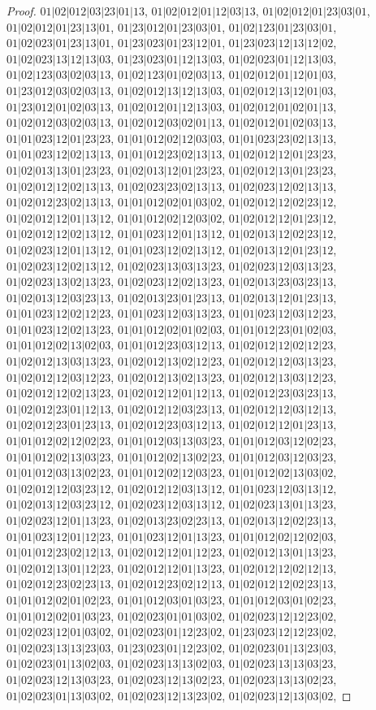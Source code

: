 \documentclass[12pt]{article}
\theoremstyle{plain}
\theoremstyle{definition}
\theoremstyle{remark}
\begin{document}
\begin{proof}
$01|02|012|03|23|01|13$, $01|02|012|01|12|03|13$, $01|02|012|01|23|03|01$, $01|02|012|01|23|13|01$, $01|23|012|01|23|03|01$, $01|02|123|01|23|03|01$, $01|02|023|01|23|13|01$, $01|23|023|01|23|12|01$, $01|23|023|12|13|12|02$, $01|02|023|13|12|13|03$, $01|23|023|01|12|13|03$, $01|02|023|01|12|13|03$, $01|02|123|03|02|03|13$, $01|02|123|01|02|03|13$, $01|02|012|01|12|01|03$, $01|23|012|03|02|03|13$, $01|02|012|13|12|13|03$, $01|02|012|13|12|01|03$, $01|23|012|01|02|03|13$, $01|02|012|01|12|13|03$, $01|02|012|01|02|01|13$, $01|02|012|03|02|03|13$, $01|02|012|03|02|01|13$, $01|02|012|01|02|03|13$, $01|01|023|12|01|23|23$, $01|01|012|02|12|03|03$, $01|01|023|23|02|13|13$, $01|01|023|12|02|13|13$, $01|01|012|23|02|13|13$, $01|02|012|12|01|23|23$, $01|02|013|13|01|23|23$, $01|02|013|12|01|23|23$, $01|02|012|13|01|23|23$, $01|02|012|12|02|13|13$, $01|02|023|23|02|13|13$, $01|02|023|12|02|13|13$, $01|02|012|23|02|13|13$, $01|01|012|02|01|03|02$, $01|02|012|12|02|23|12$, $01|02|012|12|01|13|12$, $01|01|012|02|12|03|02$, $01|02|012|12|01|23|12$, $01|02|012|12|02|13|12$, $01|01|023|12|01|13|12$, $01|02|013|12|02|23|12$, $01|02|023|12|01|13|12$, $01|01|023|12|02|13|12$, $01|02|013|12|01|23|12$, $01|02|023|12|02|13|12$, $01|02|023|13|03|13|23$, $01|02|023|12|03|13|23$, $01|02|023|13|02|13|23$, $01|02|023|12|02|13|23$, $01|02|013|23|03|23|13$, $01|02|013|12|03|23|13$, $01|02|013|23|01|23|13$, $01|02|013|12|01|23|13$, $01|01|023|12|02|12|23$, $01|01|023|12|03|13|23$, $01|01|023|12|03|12|23$, $01|01|023|12|02|13|23$, $01|01|012|02|01|02|03$, $01|01|012|23|01|02|03$, $01|01|012|02|13|02|03$, $01|01|012|23|03|12|13$, $01|02|012|12|02|12|23$, $01|02|012|13|03|13|23$, $01|02|012|13|02|12|23$, $01|02|012|12|03|13|23$, $01|02|012|12|03|12|23$, $01|02|012|13|02|13|23$, $01|02|012|13|03|12|23$, $01|02|012|12|02|13|23$, $01|02|012|12|01|12|13$, $01|02|012|23|03|23|13$, $01|02|012|23|01|12|13$, $01|02|012|12|03|23|13$, $01|02|012|12|03|12|13$, $01|02|012|23|01|23|13$, $01|02|012|23|03|12|13$, $01|02|012|12|01|23|13$, $01|01|012|02|12|02|23$, $01|01|012|03|13|03|23$, $01|01|012|03|12|02|23$, $01|01|012|02|13|03|23$, $01|01|012|02|13|02|23$, $01|01|012|03|12|03|23$, $01|01|012|03|13|02|23$, $01|01|012|02|12|03|23$, $01|01|012|02|13|03|02$, $01|02|012|12|03|23|12$, $01|02|012|12|03|13|12$, $01|01|023|12|03|13|12$, $01|02|013|12|03|23|12$, $01|02|023|12|03|13|12$, $01|02|023|13|01|13|23$, $01|02|023|12|01|13|23$, $01|02|013|23|02|23|13$, $01|02|013|12|02|23|13$, $01|01|023|12|01|12|23$, $01|01|023|12|01|13|23$, $01|01|012|02|12|02|03$, $01|01|012|23|02|12|13$, $01|02|012|12|01|12|23$, $01|02|012|13|01|13|23$, $01|02|012|13|01|12|23$, $01|02|012|12|01|13|23$, $01|02|012|12|02|12|13$, $01|02|012|23|02|23|13$, $01|02|012|23|02|12|13$, $01|02|012|12|02|23|13$, $01|01|012|02|01|02|23$, $01|01|012|03|01|03|23$, $01|01|012|03|01|02|23$, $01|01|012|02|01|03|23$, $01|02|023|01|01|03|02$, $01|02|023|12|12|23|02$, $01|02|023|12|01|03|02$, $01|02|023|01|12|23|02$, $01|23|023|12|12|23|02$, $01|02|023|13|13|23|03$, $01|23|023|01|12|23|02$, $01|02|023|01|13|23|03$, $01|02|023|01|13|02|03$, $01|02|023|13|13|02|03$, $01|02|023|13|13|03|23$, $01|02|023|12|13|03|23$, $01|02|023|12|13|02|23$, $01|02|023|13|13|02|23$, $01|02|023|01|13|03|02$, $01|02|023|12|13|23|02$, $01|02|023|12|13|03|02$, 
\end{proof}
\end{document}
